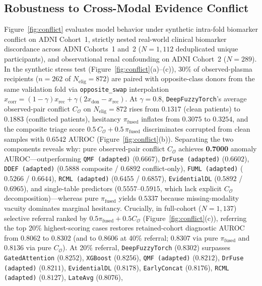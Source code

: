 \documentclass[10pt,twocolumn]{article}
\begin{document}
\subsection{Robustness to Cross-Modal Evidence Conflict}
Figure~\ref{fig:conflict} evaluates model behavior under synthetic intra-fold biomarker
conflict on ADNI Cohort~1, strictly nested real-world clinical biomarker discordance across
ADNI Cohorts~1 and~2 ($N=1,112$ deduplicated unique participants), and observational renal
confounding on ADNI Cohort~2 ($N=289$). In the synthetic stress test
(Figure~\ref{fig:conflict}(a)--(c)), $30\%$ of observed-plasma recipients ($n=262$ of
$N_{\text{elig}}=872$) are paired with opposite-class donors from the same validation fold via
\texttt{opposite\_swap} interpolation $x_{\text{corr}} = (1-\gamma)x_{\text{rec}} +
\gamma(2x_{\text{don}} - x_{\text{rec}})$. At $\gamma=0.8$, \texttt{DeepFuzzyTorch}'s average
observed-pair conflict $C_{\mathcal{O}}$ on $N_{\text{elig}}=872$ rises from $0.1317$ (clean
patients) to $0.1883$ (conflicted patients), hesitancy $\pi_{\text{fused}}$ inflates from
$0.3075$
to $0.3254$, and the composite triage score $0.5\,C_{\mathcal{O}} + 0.5\,\pi_{\text{fused}}$
discriminates corrupted from clean samples with $0.6542$ AUROC (Figure~\ref{fig:conflict}(b)).
Separating the two components reveals why: pure observed-pair conflict $C_{\mathcal{O}}$
achieves
\textbf{0.7000} anomaly AUROC---outperforming \texttt{QMF (adapted)} ($0.6667$),
\texttt{DrFuse (adapted)}
($0.6602$), \texttt{DDEF (adapted)} ($0.5888$ composite / $0.6892$ conflict-only), \texttt{FUML
(adapted)} ($0.5266$ / $0.6644$), \texttt{RCML (adapted)} ($0.6455$ / $0.6857$),
\texttt{EvidentialDL} ($0.5892$ / $0.6965$), and single-table predictors
($0.5557\text{--}0.5915$,
which lack explicit $C_{\mathcal{O}}$ decomposition)---whereas pure $\pi_{\text{fused}}$ yields
$0.5337$ because missing-modality vacuity dominates marginal hesitancy. Crucially, in
full-cohort ($N=1,137$) selective referral ranked by $0.5\pi_{\text{fused}} + 0.5
C_{\mathcal{O}}$ (Figure~\ref{fig:conflict}(c)), referring the top 20\%
highest-scoring cases restores retained-cohort diagnostic AUROC from $0.8062$ to $0.8302$ (and
to $0.8606$ at 40\% referral; $0.8307$ via pure $\pi_{\text{fused}}$ and $0.8136$ via pure
$C_{\mathcal{O}}$). At 20\% referral, \texttt{DeepFuzzyTorch} ($0.8302$) surpasses
\texttt{GatedAttention} ($0.8252$), \texttt{XGBoost} ($0.8256$), \texttt{QMF (adapted)}
($0.8212$),
\texttt{DrFuse (adapted)} ($0.8211$), \texttt{EvidentialDL} ($0.8178$), \texttt{EarlyConcat}
($0.8176$), \texttt{RCML (adapted)} ($0.8127$), \texttt{LateAvg} ($0.8076$),
\end{document}
